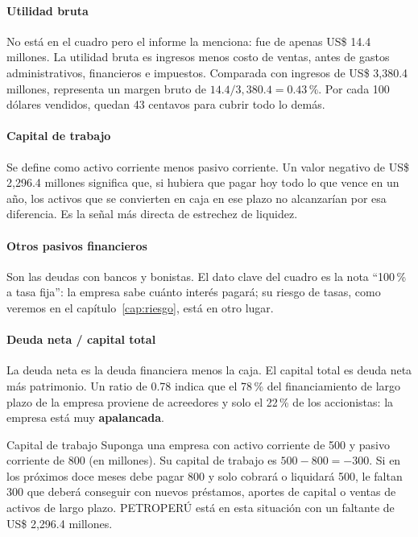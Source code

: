 \paragraph{Utilidad bruta} No está en el cuadro pero el informe la menciona: fue de apenas US\$ 14.4 millones. La utilidad bruta es ingresos menos costo de ventas, antes de gastos administrativos, financieros e impuestos. Comparada con ingresos de US\$ 3,380.4 millones, representa un margen bruto de $14.4/3{,}380.4 = 0.43\,\%$. Por cada 100 dólares vendidos, quedan 43 centavos para cubrir todo lo demás.

\paragraph{Capital de trabajo} Se define como activo corriente menos pasivo corriente. Un valor negativo de US\$ 2,296.4 millones significa que, si hubiera que pagar hoy todo lo que vence en un año, los activos que se convierten en caja en ese plazo no alcanzarían por esa diferencia. Es la señal más directa de estrechez de liquidez.

\paragraph{Otros pasivos financieros} Son las deudas con bancos y bonistas. El dato clave del cuadro es la nota \enquote{100\,\% a tasa fija}: la empresa sabe cuánto interés pagará; su riesgo de tasas, como veremos en el capítulo~\ref{cap:riesgo}, está en otro lugar.

\paragraph{Deuda neta / capital total} La deuda neta es la deuda financiera menos la caja. El capital total es deuda neta más patrimonio. Un ratio de 0.78 indica que el 78\,\% del financiamiento de largo plazo de la empresa proviene de acreedores y solo el 22\,\% de los accionistas: la empresa está muy \textbf{apalancada}.

\begin{ejemplo}{Capital de trabajo}
Suponga una empresa con activo corriente de 500 y pasivo corriente de 800 (en millones). Su capital de trabajo es $500-800=-300$. Si en los próximos doce meses debe pagar 800 y solo cobrará o liquidará 500, le faltan 300 que deberá conseguir con nuevos préstamos, aportes de capital o ventas de activos de largo plazo. PETROPERÚ está en esta situación con un faltante de US\$ 2,296.4 millones.
\end{ejemplo}

